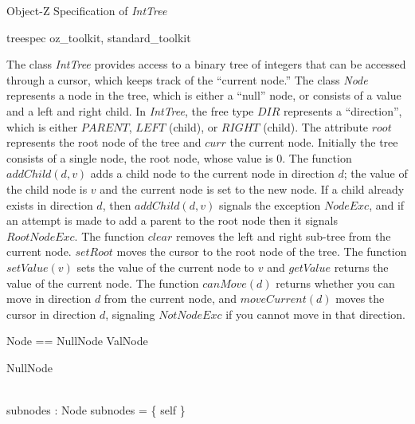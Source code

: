 
\begin{center}
\begin{large}
Object-Z Specification of {\em IntTree}
\end{large}
\end{center}

\begin{zsection}
  \SECTION treespec \parents oz\_toolkit, standard\_toolkit
\end{zsection}

\noindent
The class {\em IntTree} provides access to a binary tree of integers that
can be accessed through a cursor, which keeps track of the ``current node.''
The class {\em Node} represents a node in the tree, which is either a
``null'' node, or consists of a value and a left and right child.
In {\em IntTree}, the free type $DIR$ represents a ``direction'', which
is either $PARENT$, $LEFT$ (child), or $RIGHT$ (child).
The attribute $root$ represents the root node of the tree
and $curr$ the current node.
Initially the tree consists of a single node, the root node, whose value
is 0.
The function $addChild(d,v)$ adds a child node to the current node in
direction $d$; the value of the child node is $v$ and the current node
is set to the new node.
If a child already exists in direction $d$, then $addChild(d,v)$ signals
the exception $NodeExc$, and if an attempt is made to add a parent to the
root node then it signals $RootNodeExc$.
The function $clear$ removes the left and right sub-tree from the current node.
$setRoot$ moves the cursor to the root node of the tree.
The function $setValue(v)$ sets the value of the current node to $v$ and
$getValue$ returns the value of the current node.
The function $canMove(d)$ returns whether you can move in direction $d$
from the current node, and $moveCurrent(d)$ moves the cursor in direction
$d$, signaling $NotNodeExc$ if you cannot move in that direction.

\begin{zed}
Node == NullNode \cup ValNode
\end{zed}

\begin{class}{NullNode}
\begin{state}
	\Delta \\
	subnodes : \finset Node
\where
	subnodes = \{ self \}
\end{state}
\end{class}

